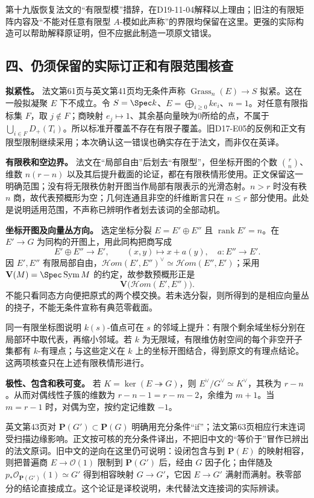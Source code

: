 第十九版恢复法文的“有限型模”措辞，在D19-11-04解释以上理由；旧注的有限矩阵内容及“不能对任意有限型 $A$-模如此声称”的界限均保留在这里。更强的实际构造可以帮助解释原证明，但不应据此制造一项原文错误。

\subsection*{四、仍须保留的实际订正和有限范围核查}

\noindent\textbf{拟紧性。}
法文第61页与英文第41页均无条件声称 $\operatorname{Grass}_n(E)\to S$ 拟紧。这在一般拟凝聚 $E$ 下不成立。令 $S=\Spec k$、$E=\bigoplus_{i\geq0}ke_i$、$n=1$。对任意有限指标集 $F$，取 $j\notin F$；商映射 $e_j\mapsto1$、其余基向量映为0所给的点，不属于 $\bigcup_{i\in F}D_+(T_i)$。所以标准开覆盖不存在有限子覆盖。旧D17-E05的反例和正文有限型限制继续采用；本次确认这一错误也确实存在于法文，而非仅在英译。

\noindent\textbf{有限秩和空边界。}
法文在“局部自由”后划去“有限型”，但坐标开图的个数 $\binom rn$、维数 $n(r-n)$ 以及其后提升截面的论证，都在有限秩情形使用。正文保留这一明确范围；没有将无限秩仿射开图当作局部有限表示的光滑态射。$n>r$ 时没有秩 $n$ 商，故代表预概形为空；几何连通且非空的纤维断言只在 $n\leq r$ 部分使用。此处是说明适用范围，不声称已辨明作者划去该词的全部动机。

\noindent\textbf{坐标开图及向量丛方向。}
选定坐标分裂 $E=E'\oplus E''$ 且 $\operatorname{rank}E'=n$。在 $E'\to G$ 为同构的开图上，用此同构把商写成
\[
E'\oplus E''\longrightarrow E',\qquad (x,y)\longmapsto x+a(y),
\quad a:E''\longrightarrow E'.
\]
因 $E',E''$ 有限局部自由，$\mathscr Hom(E',E'')^\vee\simeq\mathscr Hom(E'',E')$；采用 $\mathbf V(M)=\Spec\operatorname{Sym}M$ 的约定，故参数预概形正是
\[
\mathbf V\bigl(\mathscr Hom(E',E'')\bigr).
\]
不能只看同态方向便把原式的两个模交换。若未选分裂，则所得到的是相应向量丛的挠子，不能无条件宣称有典范零截面。

同一有限坐标图说明 $k(s)$-值点可在 $s$ 的邻域上提升：有限个剩余域坐标分别在局部环中取代表，再缩小邻域。若 $k$ 为无限域，有限维仿射空间的每个非空开子集都有 $k$-有理点；与这些定义在 $k$ 上的坐标开图结合，得到原文的有理点结论。这两项核查只在上述有限秩情形进行。

\noindent\textbf{极性、包含和秩可变。}
若 $K=\ker(E\twoheadrightarrow G)$，则 $E^\vee/G^\vee\simeq K^\vee$，其秩为 $r-n$。从而对偶线性子簇的维数为 $r-n-1=r-m-2$，余维为 $m+1$。当 $m=r-1$ 时，对偶为空，按约定记维数 $-1$。

英文第43页对 $\mathbf P(G')\subset\mathbf P(G)$ 明确用充分条件“if”；法文第63页相应行末连词受扫描边缘影响。正文按可核的充分条件译出，不把旧中文的“等价于”冒作已辨出的法文原词。旧中文的逆向在这里仍可说明：设闭包含与到 $\mathbf P(E)$ 的映射相容，则把普遍商 $E\to\mathcal O(1)$ 限制到 $\mathbf P(G')$ 后，经由 $G$ 因子化；由伴随及 $p_*\mathcal O_{\mathbf P(G')}(1)\simeq G'$ 得到相容映射 $G\to G'$，它因 $E\to G'$ 满射而满射。秩零部分的结论直接成立。这个论证是译校说明，未代替法文连接词的实际辨读。

